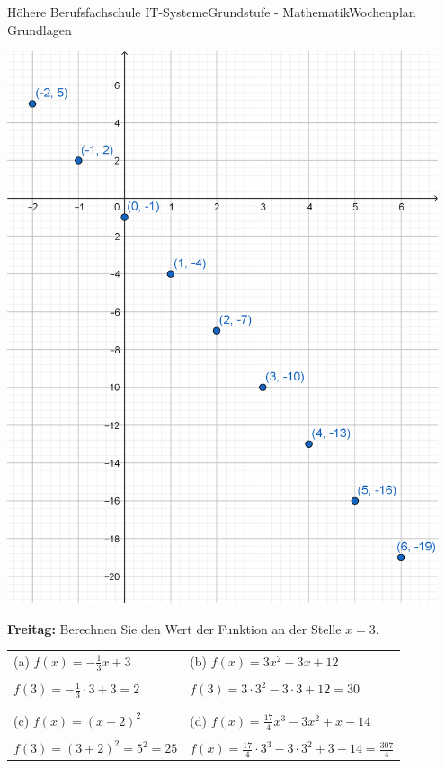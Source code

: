 \documentclass[oneside,openany,headings=optiontotoc,11pt,numbers=noenddot]{scrreprt}
\begin{document}
\begin{worksheet}{Höhere Berufsfachschule IT-Systeme}{Grundstufe - Mathematik}{Wochenplan Grundlagen}
\begin{framed}
			\includegraphics[width=0.95\textwidth]{../99_Bilder/WP3Dod.png}\\
			\par\noindent
		\end{framed}
		\newpage
		\begin{framed}
			\noindent
			\textbf{Freitag:} Berechnen Sie den Wert der Funktion an der Stelle \(x = 3\).\\
			\par\noindent
			\begin{tabularx}{\textwidth}{X|X}
				(a) \(f(x) = -\frac{1}{3}x + 3\) & (b) \(f(x) = 3x^2 - 3x + 12\)\\
				& \\
				\(f(3) = -\frac{1}{3}\cdot{}3 + 3 = 2\) & \(f(3) = 3\cdot{}3^2 - 3\cdot{}3 + 12 = 30\)\\
				& \\
				\hline
				& \\
				(c) \(f(x) = (x+2)^2\) & (d) \(f(x) = \frac{17}{4}x^3 - 3x^2 + x - 14\)\\
				& \\
				\(f(3) = (3+2)^2 = 5^2 = 25\) & \(f(x) = \frac{17}{4}\cdot{}3^3 - 3\cdot{}3^2 + 3 - 14 = \frac{307}{4}\)
			\end{tabularx}
		\end{framed}
	\end{worksheet}
\end{document}
